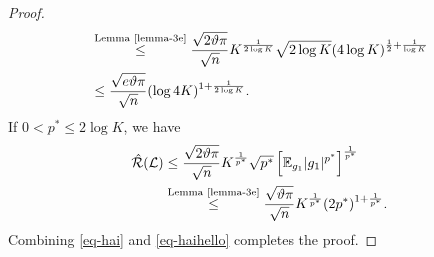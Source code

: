 \documentclass[10pt]{llncs}
\begin{document}
\begin{proof}
\begin{align}
     \nonumber &\overset{\text{Lemma \ref{lemma-3e}}}\leq \frac{\sqrt{2\vartheta\pi}}{\sqrt{n}} K^{\frac{1}{2\log K }}\sqrt{2\log K}(4\log K)^{\frac{1}{2}+\frac{1}{\log K}}\\
     &\leq \frac{\sqrt{e\vartheta\pi}}{\sqrt{n}}(\log 4K)^{1+\frac{1}{2\log K}}.
  \end{align}
  If $0<p^\ast\leq 2\log K$,
  we have
  \begin{align}
  \label{eq-haihello}
    \nonumber \hat{\mathcal{R}}(\mathcal{L})&\leq \frac{\sqrt{2\vartheta\pi}}{\sqrt{n}} K^{\frac{1}{p^\ast}}\sqrt{p^\ast}
    \left[\mathbb{E}_{g_1}|g_1|^{p^\ast}\right]^\frac{1}{p^\ast}\\
    &\overset{\text{Lemma \ref{lemma-3e}}}\leq \frac{\sqrt{\vartheta\pi}}{\sqrt{n}} K^{\frac{1}{p^\ast}}(2p^\ast)^{1+\frac{1}{p^\ast}}.
  \end{align}
  Combining \eqref{eq-hai} and \eqref{eq-haihello} completes the proof.
\end{proof}
\end{document}
